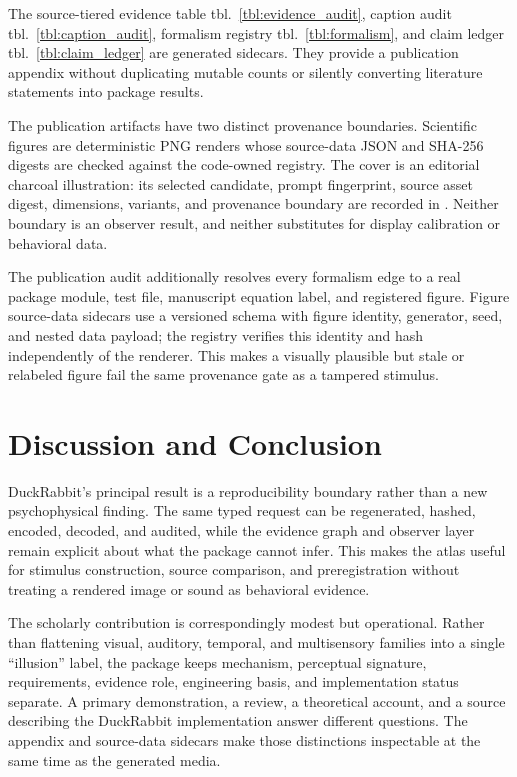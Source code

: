 \documentclass[
  english,
]{article}
\begin{document}
The source-tiered evidence table tbl.~\ref{tbl:evidence_audit}, caption
audit tbl.~\ref{tbl:caption_audit}, formalism registry
tbl.~\ref{tbl:formalism}, and claim ledger tbl.~\ref{tbl:claim_ledger}
are generated sidecars. They provide a publication appendix without
duplicating mutable counts or silently converting literature statements
into package results.

The publication artifacts have two distinct provenance boundaries.
Scientific figures are deterministic PNG renders whose source-data JSON
and SHA-256 digests are checked against the code-owned registry. The
cover is an editorial charcoal illustration: its selected candidate,
prompt fingerprint, source asset digest, dimensions, variants, and
provenance boundary are recorded in
. Neither boundary is
an observer result, and neither substitutes for display calibration or
behavioral data.

The publication audit additionally resolves every formalism edge to a
real package module, test file, manuscript equation label, and
registered figure. Figure source-data sidecars use a versioned schema
with figure identity, generator, seed, and nested data payload; the
registry verifies this identity and hash independently of the renderer.
This makes a visually plausible but stale or relabeled figure fail the
same provenance gate as a tampered stimulus.

\newpage

\section{Discussion and Conclusion}\label{sec:discussion}

DuckRabbit's principal result is a reproducibility boundary rather than
a new psychophysical finding. The same typed request can be regenerated,
hashed, encoded, decoded, and audited, while the evidence graph and
observer layer remain explicit about what the package cannot infer. This
makes the atlas useful for stimulus construction, source comparison, and
preregistration without treating a rendered image or sound as behavioral
evidence.

The scholarly contribution is correspondingly modest but operational.
Rather than flattening visual, auditory, temporal, and multisensory
families into a single ``illusion'' label, the package keeps mechanism,
perceptual signature, requirements, evidence role, engineering basis,
and implementation status separate. A primary demonstration, a review, a
theoretical account, and a source describing the DuckRabbit
implementation answer different questions. The appendix and source-data
sidecars make those distinctions inspectable at the same time as the
generated media.
\end{document}
